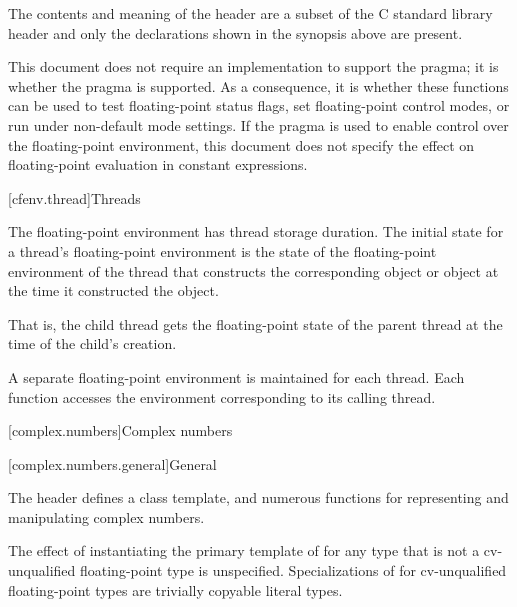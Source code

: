 \pnum
The contents and meaning of the header 
are a subset of the C standard library header  and
only the declarations shown in the synopsis above are present.
\begin{note}
This document does not require an implementation to support the
 pragma;
it is 
whether the pragma is supported. As a consequence,
it is 
whether these functions can be used to test floating-point status flags,
set floating-point control modes, or run under non-default mode settings.
If the pragma is used to enable control over the floating-point environment,
this document does not specify the effect on
floating-point evaluation in constant expressions.
\end{note}


[cfenv.thread]{Threads}

\pnum
The floating-point environment has thread storage
duration. The initial state for a thread's floating-point
environment is the state of the floating-point environment of the thread that constructs
the corresponding  object
or  object
at the time it
constructed the object.
\begin{note}
That is, the child thread gets the floating-point
state of the parent thread at the time of the child's creation.
\end{note}

\pnum
A separate floating-point environment is maintained for each thread. Each function
accesses the environment corresponding to its calling thread.

[complex.numbers]{Complex numbers}

[complex.numbers.general]{General}

\pnum
The header  defines a class template,
and numerous functions for representing and manipulating complex numbers.

\pnum
The effect of instantiating the primary template of  for any type
that is not a cv-unqualified floating-point type
is unspecified.
Specializations of  for cv-unqualified floating-point types
are trivially copyable literal types.

